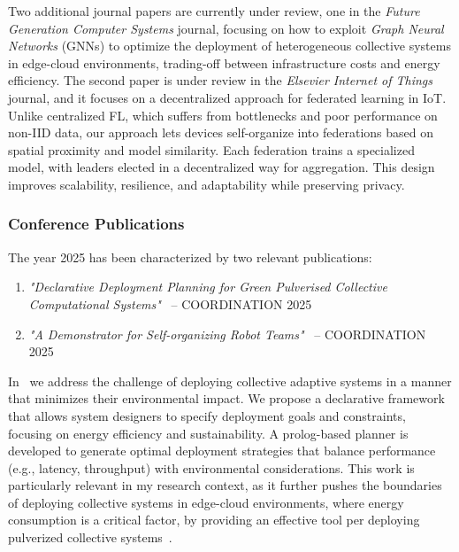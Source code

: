 \documentclass[runningheads]{llncs}
\begin{document}
Two additional journal papers are currently under review,
one in the \emph{Future Generation Computer Systems} journal,
focusing on how to exploit \emph{Graph Neural Networks} (GNNs) to optimize the deployment of heterogeneous collective systems in edge-cloud environments,
trading-off between infrastructure costs and energy efficiency.
%
The second paper is under review in the \emph{Elsevier Internet of Things} journal,
and it focuses on a decentralized approach for federated learning in IoT.
%
Unlike centralized FL,
which suffers from bottlenecks and poor performance on non-IID data,
our approach lets devices self-organize into federations based on spatial proximity and model similarity.
%
Each federation trains a specialized model,
with leaders elected in a decentralized way for aggregation.
%
This design improves scalability, resilience, and adaptability while preserving privacy.

\subsubsection{Conference Publications}

The year 2025 has been characterized by two relevant publications:

\begin{enumerate}
\item \textit{"Declarative Deployment Planning for Green Pulverised Collective Computational Systems"}~\cite{DBLP:conf/coordination/BrogiCFFV25} -- COORDINATION 2025 %
\item \textit{"A Demonstrator for Self-organizing Robot Teams"}~\cite{DBLP:conf/coordination/AguzziBBCCDFPV25} -- COORDINATION 2025 %
\end{enumerate}

In~\cite{DBLP:conf/coordination/BrogiCFFV25} we address the challenge of deploying collective adaptive systems in a manner that minimizes their environmental impact.
%
We propose a declarative framework that allows system designers to specify deployment goals and constraints, focusing on energy efficiency and sustainability.
%
A prolog-based planner is developed to generate optimal deployment strategies that balance performance (e.g., latency, throughput) with environmental considerations.
%
This work is particularly relevant in my research context,
as it further pushes the boundaries of deploying collective systems in edge-cloud environments,
where energy consumption is a critical factor,
by providing an effective tool per deploying pulverized collective systems~\cite{DBLP:journals/fgcs/FarabegoliPCV24,DBLP:journals/iot/FarabegoliPCV24,DBLP:conf/acsos/FarabegoliVC24}.
\end{document}
